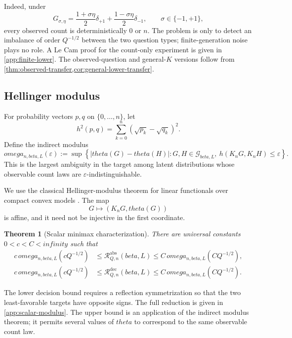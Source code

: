 \documentclass[11pt]{article}
\def\beta{beta}%
\def\theta{theta}%
\def\omega{omega}%
\def\infty{infinity}%
\newtheorem{theorem}{Theorem}[section]
\newcommand{\calG}{\mathcal G}
\newcommand{\calR}{\mathcal R}
\newcommand{\eps}{\varepsilon}
\begin{document}
Indeed, under
\[
G_{\sigma,\eta}
=
\frac{1+\sigma\eta}{2}\delta_{+1}
+
\frac{1-\sigma\eta}{2}\delta_{-1},
\qquad \sigma\in\{-1,+1\},
\]
every observed count is deterministically $0$ or $n$.  The problem is only to detect an imbalance of order $Q^{-1/2}$ between the two question types; finite-generation noise plays no role.  A Le Cam proof for the count-only experiment is given in \cref{app:finite-lower}.  The observed-question and general-$K$ versions follow from \cref{thm:observed-transfer,cor:general-lower-transfer}.

\subsection{Hellinger modulus}

For probability vectors $p,q$ on $\{0,\dots,n\}$, let
\[
h^2(p,q)
=
\sum_{k=0}^n(\sqrt{p_k}-\sqrt{q_k})^2.
\]
Define the indirect modulus
\begin{equation}
\label{eq:modulus}
\omega_{n,\beta,L}(\eps)
:=
\sup\left\{
|\theta(G)-\theta(H)|:
G,H\in\calG_{\beta,L},
\ h(K_nG,K_nH)\le\eps
\right\}.
\end{equation}
This is the largest ambiguity in the target among latent distributions whose observable count laws are $\eps$-indistinguishable.

We use the classical Hellinger-modulus theorem for linear functionals over compact convex models \citep{DonohoLiuII,JuditskyNemirovski}.  The map
\[
G\mapsto(K_nG,\theta(G))
\]
is affine, and it need not be injective in the first coordinate.

\begin{theorem}[Scalar minimax characterization]
\label{thm:scalar-modulus}
There are universal constants $0<c<C<\infty$ such that
\begin{align}
 c\,\omega_{n,\beta,L}(cQ^{-1/2})
&\le
\calR^{\mathrm{abs}}_{Q,n}(\beta,L)
\le
C\,\omega_{n,\beta,L}(CQ^{-1/2}),
\label{eq:abs-modulus}\\
 c\,\omega_{n,\beta,L}(cQ^{-1/2})
&\le
\calR^{\mathrm{dec}}_{Q,n}(\beta,L)
\le
C\,\omega_{n,\beta,L}(CQ^{-1/2}).
\label{eq:dec-modulus}
\end{align}
\end{theorem}

The lower decision bound requires a reflection symmetrization so that the two least-favorable targets have opposite signs.  The full reduction is given in \cref{app:scalar-modulus}.  The upper bound is an application of the indirect modulus theorem; it permits several values of $\theta$ to correspond to the same observable count law.
\end{document}
